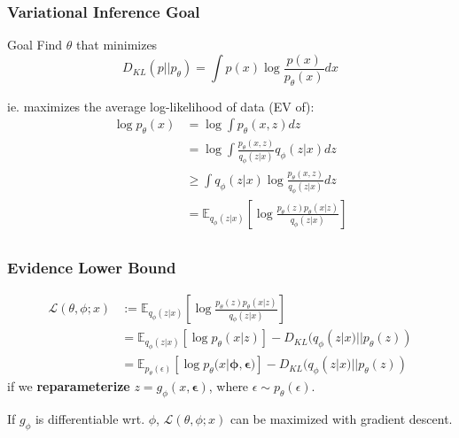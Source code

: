 \documentclass{beamer}
\begin{document}
\begin{frame}
    \frametitle{Variational Inference Goal}

    \begin{block}{Goal}
    Find $\theta$ that minimizes 
    \[D_{KL}(p || p_\theta) = \int  p(x) \log \frac{p(x)}{p_{\theta}(x)} dx\]
    \end{block}
    ie. maximizes the average log-likelihood of data (EV of):
    \begin{align*}
        \log p_{\theta}(x) &= \log \int p_{\theta}(x, z) dz \\
        &= \log \int \frac{p_{\theta}(x, z)}{q_{\phi
        }(z|x)} q_{\phi}(z|x) dz \\
        &\geq \int q_\phi(z|x) \log \frac{p_{\theta}(x, z)}{q_\phi(z|x)} dz \\
        &= \mathbb{E}_{q_\phi(z|x)} \left[ \log \frac{p_\theta(z) p_{\theta}(x|z)}{q_\phi(z|x)} \right] \\
    \end{align*}
\end{frame}

\begin{frame}
    \frametitle{Evidence Lower Bound}
    \begin{align*}
        \mathcal{L}(\theta, \phi; x) &:= \mathbb{E}_{q_\phi(z|x)} \left[ \log \frac{p_\theta(z) p_{\theta}(x|z)}{q_\phi(z|x)} \right] \\
        &= \mathbb{E}_{q_\phi(z|x)} \left[ \log p_\theta(x|z) \right] - D_{KL}(q_\phi(z|x) || p_\theta(z)) \\
        &= \mathbb{E}_{p_\theta(\epsilon)} \left[ \log p_\theta(x|\mathbf{\phi}, \mathbf{\epsilon)} \right] - D_{KL}(q_\phi(z|x) || p_\theta(z)) 
    \end{align*}
    if we \textbf{reparameterize} $z = g_\phi(x, \mathbf{\epsilon})$, where $\epsilon \sim p_\theta(\epsilon)$.
    
    If $g_\phi$ is differentiable wrt. $\phi$, $\mathcal{L}(\theta, \phi; x)$ can be maximized with gradient descent.
\end{frame}
\end{document}
